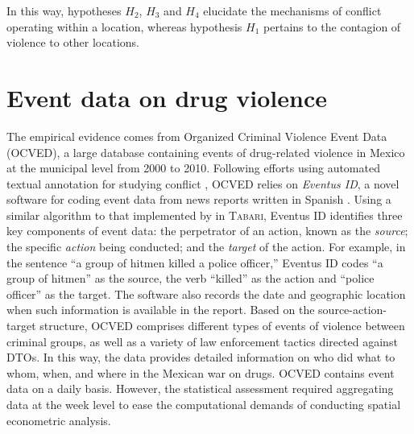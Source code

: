 \documentclass[12pt,letterpaper]{article}
\begin{document}
\noindent In this way, hypotheses $H_{2}$, $H_{3}$  and  $H_{4}$ elucidate the mechanisms of conflict operating within a location, whereas hypothesis $H_{1}$ pertains to the contagion of violence to other locations.



\section*{Event data on drug violence}

The empirical evidence comes from Organized Criminal Violence Event Data (OCVED), a large database containing events of drug-related violence in Mexico at the municipal level from 2000 to 2010. Following efforts using automated textual annotation for studying conflict \citep{Leetaru2013}, OCVED relies on \emph{Eventus ID}, a novel software for coding event data from news reports written in Spanish \citep{Osorio2014}. Using a similar algorithm to that implemented by \citet{Schrodt2009} in \textsc{Tabari}, Eventus ID identifies three key components of event data: the perpetrator of an action, known as the \emph{source}; the specific \emph{action} being conducted; and the \emph{target} of the action. For example, in the sentence ``a group of hitmen killed a police officer,'' Eventus ID codes ``a group of hitmen'' as the source, the verb ``killed'' as the action  and ``police officer'' as the target. The software also records the date and geographic location when such information is available in the report. Based on the source-action-target structure, OCVED comprises different types of events of violence between criminal groups, as well as a variety of law enforcement tactics directed against DTOs. In this way, the data provides detailed information on who did what to whom, when, and where in the Mexican war on drugs. OCVED contains event data on a daily basis. However, the statistical assessment required aggregating data at the week level to ease the computational demands of conducting spatial econometric analysis.    
\end{document}
